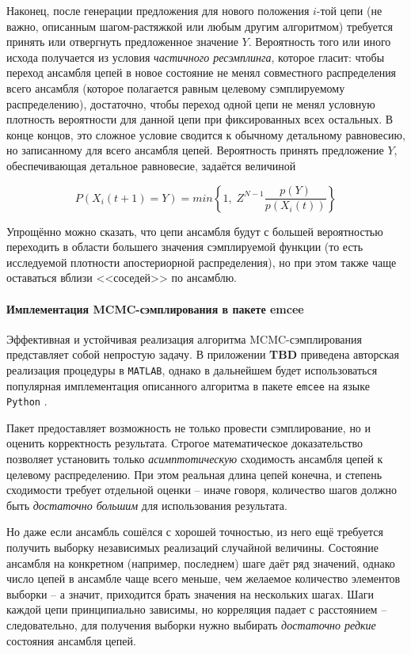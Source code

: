 \documentclass[12pt]{book}
\begin{document}
	Наконец, после генерации предложения для нового положения $i$-той цепи (не важно, описанным шагом-растяжкой или любым другим алгоритмом) требуется принять или отвергнуть предложенное значение $Y$. Вероятность того или иного исхода получается из условия \textit{частичного ресэмплинга}, которое гласит: чтобы переход ансамбля цепей в новое состояние не менял совместного распределения всего ансамбля (которое полагается равным целевому сэмплируемому распределению), достаточно, чтобы переход одной цепи не менял условную плотность вероятности для данной цепи при фиксированных всех остальных. В конце концов, это сложное условие сводится к обычному детальному равновесию, но записанному для всего ансамбля цепей. Вероятность принять предложение $Y$, обеспечивающая детальное равновесие, задаётся величиной
	
	\begin{equation}
		P(X_i(t + 1) = Y) = min \left\{ 1, \; Z^{N - 1} \frac{p(Y)}{p(X_i(t))} \right\}
	\end{equation}

	Упрощённо можно сказать, что цепи ансамбля будут с большей вероятностью переходить в области большего значения сэмплируемой функции (то есть исследуемой плотности апостериорной распределения), но при этом также чаще оставаться вблизи <<соседей>> по ансамблю.

	\paragraph{Имплементация MCMC-сэмплирования в пакете emcee}
	
	\label{sec:mcmc-implementation-details}

	Эффективная и устойчивая реализация алгоритма MCMC-сэмплирования представляет собой непростую задачу. В приложении \textbf{TBD} приведена авторская реализация процедуры в \verb|MATLAB|, однако в дальнейшем будет использоваться популярная имплементация описанного алгоритма в пакете \verb|emcee| на языке \verb|Python| \cite{ForemanMackey2016}.

	Пакет предоставляет возможность не только провести сэмплирование, но и оценить корректность результата. Строгое математическое доказательство позволяет установить только \textit{асимптотическую} сходимость ансамбля цепей к целевому распределению. При этом реальная длина цепей конечна, и степень сходимости требует отдельной оценки -- иначе говоря, количество шагов должно быть \textit{достаточно большим} для использования результата.
	
	Но даже если ансамбль сошёлся с хорошей точностью, из него ещё требуется получить выборку независимых реализаций случайной величины. Состояние ансамбля на конкретном (например, последнем) шаге даёт ряд значений, однако число цепей в ансамбле чаще всего меньше, чем желаемое количество элементов выборки -- а значит, приходится брать значения на нескольких шагах. Шаги каждой цепи принципиально зависимы, но корреляция падает с расстоянием -- следовательно, для получения выборки нужно выбирать \textit{достаточно редкие} состояния ансамбля цепей.
\end{document}
